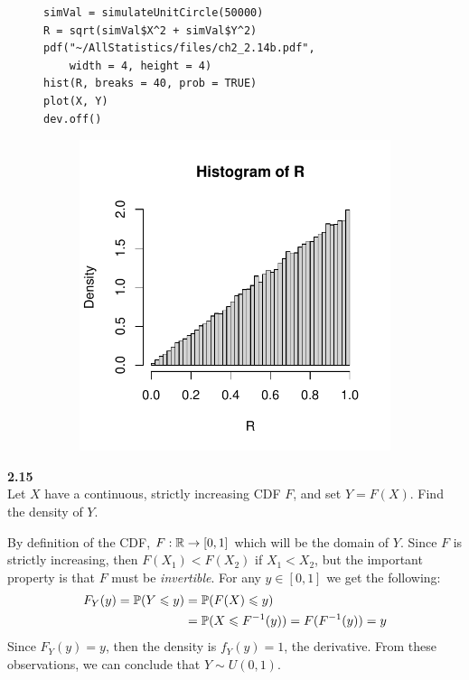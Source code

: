 \begin{figure}[H]
\begin{minipage}{0.5\textwidth}
    \begin{lstlisting}[style=RSyntax]
simVal = simulateUnitCircle(50000)
R = sqrt(simVal$X^2 + simVal$Y^2)
pdf("~/AllStatistics/files/ch2_2.14b.pdf",
    width = 4, height = 4)
hist(R, breaks = 40, prob = TRUE)
plot(X, Y)
dev.off()
    \end{lstlisting}
    \rule{0pt}{55pt}
\end{minipage}
\begin{minipage}{0.5\textwidth}
    \begin{center}
        \begin{figure}[H]
        \includegraphics[scale=0.7]{ch2_2.14b.pdf}
        \end{figure}
    \end{center}
\end{minipage}
\end{figure}

\newpage\noindent
\textbf{2.15}\\  %
Let $X$ have a continuous, strictly increasing CDF $F$, and set $Y = F(X)$.
Find the density of $Y$.

By definition of the CDF, $F: \R\rightarrow [0,1]$ which will be the domain
of $Y$. Since $F$ is strictly increasing, then $F(X_1) < F(X_2)$ if $X_1 < X_2$,
but the important property is that $F$ must be \emph{invertible}. For any $y\in[0,1]$
we get the following:
\begin{align*}
    F_Y(y) = \P(Y\leq y) &= \P(F(X) \leq y) \\
    &= \P(X\leq F^{-1}(y)) 
    = F(F^{-1}(y)) = y
\end{align*}
Since $F_Y(y) = y$, then the density is $f_Y(y) = 1$, the derivative. From these observations,
we can conclude that $Y\sim U(0,1)$.


